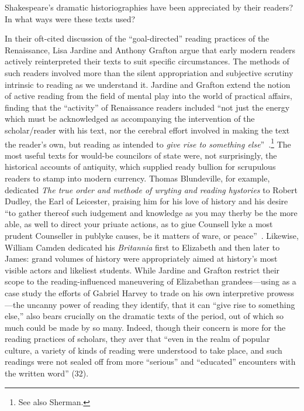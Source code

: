Shakespeare's dramatic historiographies have been appreciated by their readers? In what ways were these texts used?

In their oft-cited discussion of the ``goal-directed'' reading practices of the Renaissance, Lisa Jardine and Anthony Grafton argue that early modern readers actively reinterpreted their texts to suit specific circumstances. The methods of such readers involved more than the silent appropriation and subjective scrutiny intrinsic to reading as we understand it. Jardine and Grafton extend the notion of active reading from the field of mental play into the world of practical affairs, finding that the ``activity'' of Renaissance readers included ``not just the energy which must be acknowledged as accompanying the intervention of the scholar/reader with his text, nor the cerebral effort involved in making the text the reader's own, but reading as intended to \emph{give rise to something else}''~\cite[30]{jardine_studied_1990}.\footnote{See also Sherman.\nocite{sherman_used_2008}} The most useful texts for would-be councilors of state were, not surprisingly, the historical accounts of antiquity, which supplied ready bullion for scrupulous readers to stamp into modern currency. Thomas Blundeville, for example, dedicated \emph{The true order and methode of wryting and reading hystories} to Robert Dudley, the Earl of Leicester, praising him for his love of history and his desire ``to gather thereof such iudgement and knowledge as you may therby be the more able, as well to direct your priuate actions, as to giue Counsell lyke a most prudent Counseller in publyke causes, be it matters of ware, or peace''~\cite[sig. A2r]{blundeville_true_1574}. Likewise, William Camden dedicated his \emph{Britannia} first to Elizabeth and then later to James: grand volumes of history were appropriately aimed at history's most visible actors and likeliest students. While Jardine and Grafton restrict their scope to the reading-influenced maneuvering of Elizabethan grandees---using as a case study the efforts of Gabriel Harvey to trade on his own interpretive prowess---the uncanny power of reading they identify, that it can ``give rise to something else,'' also bears crucially on the dramatic texts of the period, out of which so much could be made by so many. Indeed, though their concern is more for the reading practices of scholars, they aver that ``even in the realm of popular culture, a variety of kinds of reading were understood to take place, and such readings were not sealed off from more ``serious'' and ``educated'' encounters with the written word'' (32).

